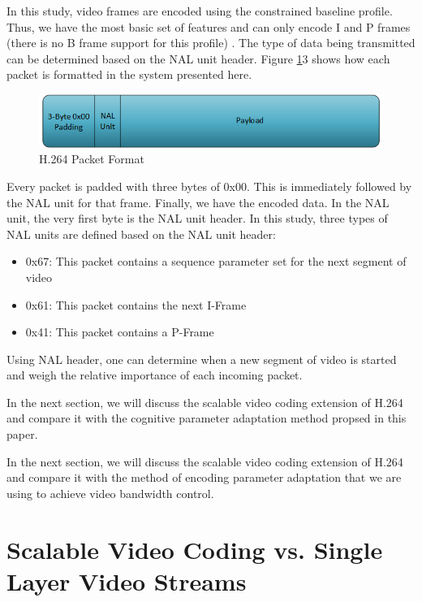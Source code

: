 \documentclass[a4paper,12pt]{article}
\begin{document}
In this study, video frames are encoded using the constrained baseline profile. Thus, we have the most basic set of features and can only encode I and P frames (there is no B frame support for this profile) \cite{H264Spec}. The type of data being transmitted can be determined based on the NAL unit header. Figure \ref{fig:H264PacketFormat}3 shows how each packet is formatted in the system presented here.
\begin{figure}[h]
\centering
\includegraphics[width=0.8\linewidth]{H264HeaderFormat.png}
\caption{H.264 Packet Format}
\label{fig:H264PacketFormat}
\end{figure}
Every packet is padded with three bytes of 0x00. This is immediately followed by the NAL unit for that frame. Finally, we have the encoded data. In the NAL unit, the very first byte is the NAL unit header. In this study, three types of NAL units are defined based on the NAL unit header:
\begin{itemize}
\item 0x67: This packet contains a sequence parameter set for the next segment of video
\item 0x61: This packet contains the next I-Frame
\item 0x41: This packet contains a P-Frame
\end{itemize}
Using NAL header, one can determine when a new segment of video is started and weigh the relative importance of each incoming packet. 

In the next section, we will discuss the scalable video coding extension of H.264 and compare it with the cognitive parameter adaptation method propsed in this paper.

In the next section, we will discuss the scalable video coding extension of H.264 and compare it with the method of encoding parameter adaptation that we are using to achieve video bandwidth control.


\section{Scalable Video Coding vs. Single Layer Video Streams}
\label{sec:SVC}
\end{document}
